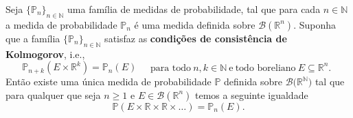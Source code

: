 \begin{teorema}
Seja $\{\mathbb{P}_n\}_{n\in\mathbb{N}}$ 
uma família de medidas de probabilidade, 
tal que para cada $n\in\mathbb{N}$ a
medida de probabilidade $\mathbb{P}_n$ é uma medida definida 
sobre $\mathscr{B}(\mathbb{R}^{n})$. 
Suponha que a família $\{\mathbb{P}_n\}_{n\in\mathbb{N}}$  
satisfaz as 
\textbf{condições de consistência de Kolmogorov}, i.e.,
\[
\mathbb{P}_{n+k}(E\times\mathbb{R}^k)
=
\mathbb{P}_n(E)
\quad
\begin{array}{c}
\text{para todo}\ n,k\in\mathbb{N}\ \text{e}\ 
\text{todo boreliano}\ E\subseteq \mathbb{R}^n.
\end{array}
\]
Então existe uma única medida de probabilidade 
$\mathbb{P}$ definida sobre 
$\mathscr{B}\big(\mathbb{R}^{\mathbb{N}}\big)$
tal que para qualquer que seja $n\geq 1$ e 
$E\in \mathscr{B}(\mathbb{R}^{n})$ temos 
a seguinte igualdade 
\[
\mathbb{P}(E\times\mathbb{R}\times\mathbb{R}\times\ldots)
=
\mathbb{P}_n(E).
\]
\end{teorema}
